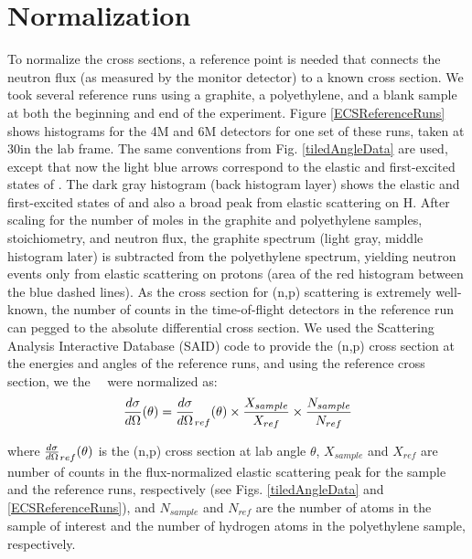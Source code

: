 \section{Normalization}
To normalize the cross sections, a reference point is needed that connects the
neutron flux (as measured by the monitor detector) to a known cross section.
We took several reference runs using a graphite,
a polyethylene, and a blank sample at both the beginning and end of the experiment.
Figure \ref{ECSReferenceRuns} shows histograms for the 4M and 6M detectors for
one set of these runs, taken at 30\textdegree in the lab frame.
The same conventions from Fig.
\ref{tiledAngleData} are used, except that now the light blue arrows correspond to
the elastic and first-excited states of \cTwelve. The dark gray histogram (back
histogram layer) shows the elastic and first-excited states of \cTwelve
and also a broad peak from elastic scattering on H. After scaling for the number
of moles in the graphite and polyethylene samples, stoichiometry, and neutron
flux, the graphite spectrum (light gray, middle histogram later) is subtracted from the polyethylene
spectrum, yielding neutron events only from elastic scattering on protons (area of
the red histogram between the blue dashed lines). As the cross section for
(n,p) scattering is extremely well-known, the number of counts in the
time-of-flight detectors in the reference run can pegged to the absolute
differential cross section.
We used the Scattering Analysis Interactive Database (SAID) code \cite{SAIDCode}
to provide the (n,p) cross section at the energies and angles of the reference
runs, and using the reference cross section, we the \snTwelveFour\
\el\ were normalized as:
\begin{equation} \label{ECSCalculation}
    \frac{d\sigma}{d\Omega}(\theta) = \frac{d\sigma}{d\Omega}_{ref}(\theta)
    \times \frac{X_{sample}}{X_{ref}} \times
    \frac{N_{sample}}{N_{ref}}
\end{equation}

\noindent
where $\frac{d\sigma}{d\Omega}_{ref}(\theta)$ is the (n,p) cross section at lab angle $\theta$, $X_{sample}$
and $X_{ref}$ are number of counts in the flux-normalized elastic scattering peak for the sample
and the reference runs, respectively (see Figs. \ref{tiledAngleData} and
\ref{ECSReferenceRuns}), and $N_{sample}$ and $N_{ref}$ are the number of atoms in
the sample of interest and the number of hydrogen atoms in the polyethylene
sample, respectively.

